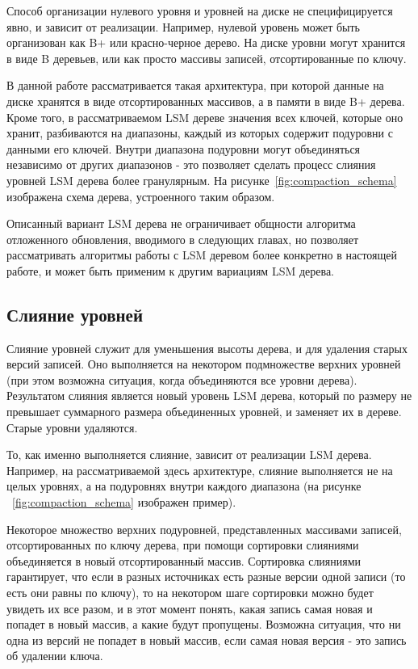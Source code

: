 \documentclass[a4paper,hidelinks,12pt]{article}
\begin{document}
Способ организации нулевого уровня и уровней на диске не специфицируется явно,
и зависит от реализации. Например, нулевой уровень может быть организован как
B+ или красно-черное дерево. На диске уровни могут хранится в виде B деревьев,
или как просто массивы записей, отсортированные по ключу.

В данной работе рассматривается такая архитектура, при которой данные на диске
хранятся в виде отсортированных массивов, а в памяти в виде B+ дерева. Кроме
того, в рассматриваемом LSM дереве значения всех ключей, которые оно хранит,
разбиваются на диапазоны, каждый из которых содержит подуровни с данными его
ключей. Внутри диапазона подуровни могут объединяться независимо от других
диапазонов - это позволяет сделать процесс слияния уровней LSM дерева более
гранулярным. На рисунке~\ref{fig:compaction_schema} изображена схема дерева,
устроенного таким образом.

Описанный вариант LSM дерева не ограничивает общности алгоритма отложенного
обновления, вводимого в следующих главах, но позволяет рассматривать алгоритмы
работы с LSM деревом более конкретно в настоящей работе, и может быть применим к
другим вариациям LSM дерева.

\subsection{Слияние уровней}

Слияние уровней служит для уменьшения высоты дерева, и для удаления старых
версий записей. Оно выполняется на некотором подмножестве верхних уровней (при
этом возможна ситуация, когда объединяются все уровни дерева). Результатом
слияния является новый уровень LSM дерева, который по размеру не превышает
суммарного размера объединенных уровней, и заменяет их в дереве. Старые уровни
удаляются.

То, как именно выполняется слияние, зависит от реализации LSM дерева. Например,
на рассматриваемой здесь архитектуре, слияние выполняется не на целых уровнях, а
на подуровнях внутри каждого диапазона (на рисунке ~\ref{fig:compaction_schema}
изображен пример).

Некоторое множество верхних подуровней, представленных массивами записей,
отсортированных по ключу дерева, при помощи сортировки слияниями объединяется
в новый отсортированный массив. Сортировка слияниями гарантирует, что если
в разных источниках есть разные версии одной записи (то есть они равны по
ключу), то на некотором шаге сортировки можно будет увидеть их все разом, и в
этот момент понять, какая запись самая новая и попадет в новый массив, а какие
будут пропущены. Возможна ситуация, что ни одна из версий не попадет в новый
массив, если самая новая версия - это запись об удалении ключа.
\end{document}
